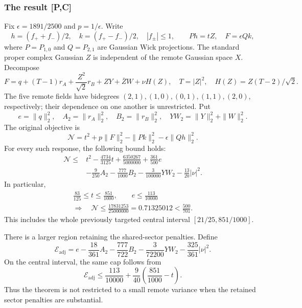 \subsubsection{The result [P,C]}
Fix $\epsilon=1891/2500$ and $p=1/\epsilon$. Write
\[
 h=(f_++f_-)/2,\quad k=(f_+-f_-)/2,\quad |f_\pm|\le1,
 \qquad Ph=tZ,\quad F=\epsilon Qk,
\]
where $P=P_{1,0}$ and $Q=P_{2,1}$ are Gaussian Wick projections.
The standard proper complex Gaussian $Z$ is independent of the remote
Gaussian space $X$. Decompose
\[
 F=q+(T-1)r_A+\frac{Z^2}{\sqrt2}r_B+ZY+\bar ZW+\nu H(Z),
 \quad T=|Z|^2,\quad H(Z)=Z(T-2)/\sqrt2.
\]
The five remote fields have bidegrees $(2,1),(1,0),(0,1),(1,1),(2,0)$,
respectively; their dependence on one another is unrestricted. Put
\[
 e=\|q\|_2^2,\quad A_2=\|r_A\|_2^2,\quad B_2=\|r_B\|_2^2,
 \quad YW_2=\|Y\|_2^2+\|W\|_2^2.
\]
The original objective is
\[
 \mathcal N=t^2+p\|F\|_2^2-\|Pk\|_2^2-\epsilon\|Qh\|_2^2.
\]
For every such response, the following bound holds:
\begin{equation}\label{eq:sio-rational}
\boxed{\begin{aligned}
 \mathcal N\le{}&t^2-\frac{4734}{3125}t+\frac{6350267}{5000000}
       +\frac{361}{500}e\\
 &-\frac9{250}A_2-\frac{777}{1000}B_2
       -\frac3{100000}YW_2-\frac{13}{20}|\nu|^2.
\end{aligned}}
\end{equation}
In particular,
\begin{equation}\label{eq:sio-region}
\boxed{\begin{gathered}
 \frac{83}{125}\le t\le\frac{851}{1000},\qquad e\le\frac{113}{10000}
 \\\Longrightarrow\quad
 \mathcal N\le\frac{17831253}{25000000}
       =0.71325012<\frac{500}{701}.
\end{gathered}}
\end{equation}
This includes the whole previously targeted central interval
$[21/25,851/1000]$.

There is a larger region retaining the shared-sector penalties. Define
\[
 \mathcal E_{\mathrm{adj}}=e-\frac{18}{361}A_2-\frac{777}{722}B_2
             -\frac3{72200}YW_2-\frac{325}{361}|\nu|^2.
\]
On the central interval, the same cap follows from
\begin{equation}\label{eq:sio-adjusted}
 \boxed{\quad
 \mathcal E_{\mathrm{adj}}\le\frac{113}{10000}
       +\frac9{40}\left(\frac{851}{1000}-t\right).
 \quad}
\end{equation}
Thus the theorem is not restricted to a small remote variance when the
retained sector penalties are substantial.

